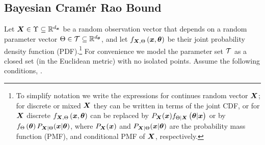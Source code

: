 \subsection{Bayesian Cram\'er Rao Bound}
Let $\X\in\Upsilon\subseteq\mathbb{R}^\nx$ be a random observation vector {that depends on a random parameter vector} $\Theta\in\mathcal{T}\subseteq\mathbb{R}^{d_{\bm{\theta}}}$, %
and let $\probt{\x,\p}{\X,\pr}$ be their joint {probability density function (PDF).}\footnote{To simplify  notation we write the expressions for continues random vector $\X$;  for discrete or mixed $\X$ they can be written in terms of the joint CDF, or for $\X$ discrete $\probt{\x,\p}{\X,\pr}$ can be replaced by $P_{\X}(\x)\probt{\p | \x}{\pr|\X}$ or by $\probt{\p}{\pr} P_{\X|\pr}(\x|\p)$, where $P_{\X}(\x)$ and $P_{\X|\pr}(\x|\p)$ are the probability mass function (PMF), and conditional PMF of $\X$, respectively.  
}
For convenience we model the parameter set $\mathcal{T}$ as a closed set (in the Euclidean metric) with no isolated points. Assume
the following conditions\cite[pages 33-35]{van2007bayesian}, \cite{weinstein1988general}. 
